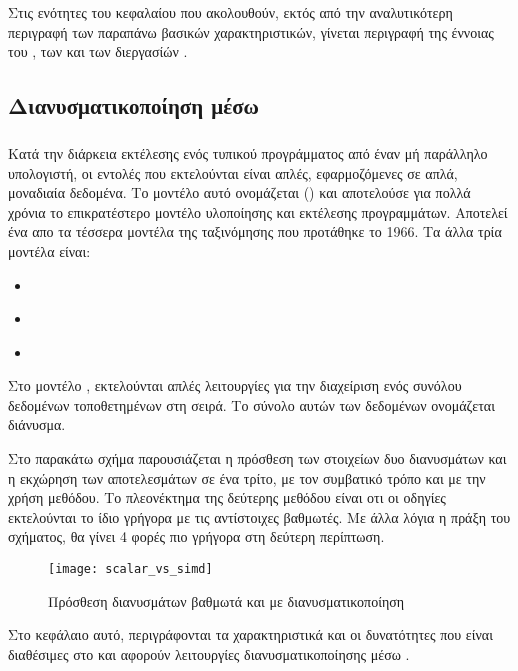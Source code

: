 Στις ενότητες του κεφαλαίου που ακολουθούν, εκτός από την αναλυτικότερη περιγραφή των παραπάνω βασικών χαρακτηριστικών,
γίνεται περιγραφή της έννοιας του \emph{}, των \emph{} και των
διεργασίών \emph{}.


\subsection{Διανυσματικοποίηση μέσω \emph{}}
\subparagraph{}

Κατά την διάρκεια εκτέλεσης ενός τυπικού προγράμματος από έναν μή παράλληλο υπολογιστή, οι εντολές που εκτελούνται είναι
απλές, εφαρμοζόμενες σε απλά, μοναδιαία δεδομένα. Το μοντέλο αυτό ονομάζεται (\emph{}) και αποτελούσε για πολλά χρόνια το επικρατέστερο μοντέλο υλοποίησης και εκτέλεσης προγραμμάτων.
Αποτελεί ένα απο τα τέσσερα μοντέλα της ταξινόμησης \emph{} που προτάθηκε το 1966\cite{flynn}. Τα άλλα τρία
μοντέλα είναι: 
\begin{itemize}
\item{\emph{}}
\item{\emph{}}
\item{\emph{}}
\end{itemize}


Στο μοντέλο \emph{}, εκτελούνται απλές λειτουργίες για την διαχείριση ενός
συνόλου δεδομένων τοποθετημένων στη σειρά. Το σύνολο αυτών των δεδομένων ονομάζεται διάνυσμα.

Στο παρακάτω σχήμα παρουσιάζεται η πρόσθεση των στοιχείων δυο διανυσμάτων και η εκχώρηση των αποτελεσμάτων σε ένα τρίτο,
με τον συμβατικό τρόπο και με την χρήση \emph{} μεθόδου. Το πλεονέκτημα της δεύτερης μεθόδου είναι οτι οι
\emph{} οδηγίες εκτελούνται το ίδιο γρήγορα με τις αντίστοιχες βαθμωτές. Με άλλα λόγια η πράξη του σχήματος, θα
γίνει 4 φορές πιο γρήγορα στη δεύτερη περίπτωση.

\begin{figure}[h]
\texttt{[image: scalar\_vs\_simd]}
\centering
\captionsetup{justification=centering, singlelinecheck=false}
	\caption{ Πρόσθεση διανυσμάτων βαθμωτά και με διανυσματικοποίηση}
\label{fig:scalar_vs_simd}
\end{figure}

 Στο κεφάλαιο αυτό, περιγράφονται τα χαρακτηριστικά και οι δυνατότητες που είναι διαθέσιμες στο \emph{} και
 αφορούν λειτουργίες διανυσματικοποίησης μέσω \emph{}. 

